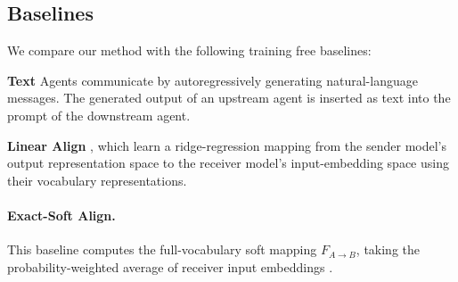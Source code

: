 \documentclass[11pt]{article}
\begin{document}
\subsection{Baselines}
We compare our method with the following training free baselines: \par
\noindent\textbf{Text} Agents communicate by autoregressively generating natural-language messages. The generated output of an upstream agent is inserted as text into the prompt of the downstream agent. \par

\noindent\textbf{Linear Align} \citep{latentmas}, which learn a ridge-regression mapping from the sender model's output representation space to the receiver model's input-embedding space using their vocabulary representations.
\paragraph{Exact-Soft Align.}
This baseline computes the full-vocabulary soft mapping $F_{A\rightarrow B}$, taking the probability-weighted average of receiver input embeddings \citep{soft_thinking}.
\end{document}
